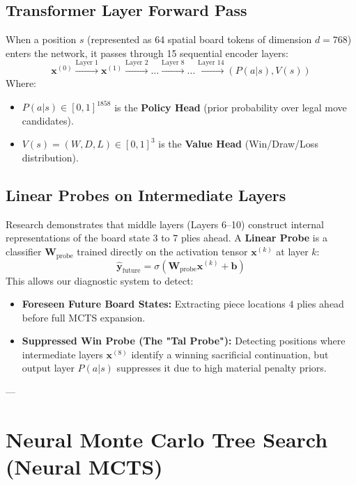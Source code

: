 \documentclass[11pt,a4paper]{article}
\begin{document}
\subsection{Transformer Layer Forward Pass}
When a position $s$ (represented as 64 spatial board tokens of dimension $d=768$) enters the network, it passes through 15 sequential encoder layers:
\begin{equation}
\mathbf{x}^{(0)} \xrightarrow{\text{Layer 1}} \mathbf{x}^{(1)} \xrightarrow{\text{Layer 2}} \dots \xrightarrow{\text{Layer 8}} \dots \xrightarrow{\text{Layer 14}} \left( P(a|s), V(s) \right)
\end{equation}
Where:
\begin{itemize}
    \item $P(a|s) \in [0, 1]^{1858}$ is the \textbf{Policy Head} (prior probability over legal move candidates).
    \item $V(s) = (W, D, L) \in [0,1]^3$ is the \textbf{Value Head} (Win/Draw/Loss distribution).
\end{itemize}

\subsection{Linear Probes on Intermediate Layers}
Research demonstrates that middle layers (Layers 6–10) construct internal representations of the board state $3$ to $7$ plies ahead. A \textbf{Linear Probe} is a classifier $\mathbf{W}_{\text{probe}}$ trained directly on the activation tensor $\mathbf{x}^{(k)}$ at layer $k$:
\begin{equation}
\hat{\mathbf{y}}_{\text{future}} = \sigma \left( \mathbf{W}_{\text{probe}} \mathbf{x}^{(k)} + \mathbf{b} \right)
\end{equation}
This allows our diagnostic system to detect:
\begin{itemize}
    \item \textbf{Foreseen Future Board States:} Extracting piece locations $4$ plies ahead before full MCTS expansion.
    \item \textbf{Suppressed Win Probe (The "Tal Probe"):} Detecting positions where intermediate layers $\mathbf{x}^{(8)}$ identify a winning sacrificial continuation, but output layer $P(a|s)$ suppresses it due to high material penalty priors.
\end{itemize}

---

\section{Neural Monte Carlo Tree Search (Neural MCTS)}
\end{document}
